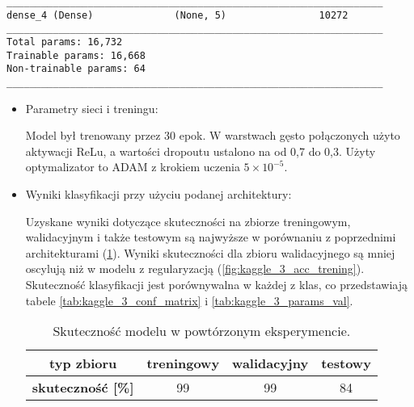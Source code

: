 {\newsavebox\myvff
\begin{lrbox}{\myvff}
\setlength{\myminipagewidth}{0.9\linewidth} %
\setlength{\myminipagecentering}{(\linewidth-\myminipagewidth)/2}
\noindent\hspace{\myminipagecentering}\begin{minipage}{\myminipagewidth}
\begin{verbatim}
_________________________________________________________________
dense_4 (Dense)              (None, 5)                10272     
_________________________________________________________________
Total params: 16,732
Trainable params: 16,668
Non-trainable params: 64
_________________________________________________________________
\end{verbatim} 
\end{minipage}\end{lrbox}
\resizebox{0.75\textwidth}{!}{\usebox\myvff}

\begin{itemize}
\item Parametry sieci i treningu:

Model był trenowany przez 30 epok. W warstwach gęsto połączonych użyto aktywacji ReLu, a wartości dropoutu ustalono na od 0,7 do 0,3. Użyty optymalizator to ADAM z krokiem uczenia \(5 \times 10^{-5}\). 

\item Wyniki klasyfikacji przy użyciu podanej architektury:

Uzyskane wyniki dotyczące skuteczności na zbiorze treningowym, walidacyjnym i także testowym są najwyższe w porównaniu z poprzednimi architekturami (\ref{tab:kaggle_3_acc_2}). Wyniki skuteczności dla zbioru walidacyjnego są mniej oscylują niż w modelu z regularyzacją (\ref{fig:kaggle_3_acc_trening}). Skuteczność klasyfikacji jest porównywalna w każdej z klas, co przedstawiają tabele \ref{tab:kaggle_3_conf_matrix} i \ref{tab:kaggle_3_params_val}.

\begin{table}[h!]
\centering
\caption[Short Heading]{Skuteczność modelu w powtórzonym eksperymencie.}
\label{tab:kaggle_3_acc_2}
\begin{tabular}{|c|c|c|c|}
\hline
\textbf{typ zbioru}           & \textbf{treningowy} & \textbf{walidacyjny} & \textbf{testowy} \\ \hline
\textbf{skuteczność {[}\%{]}} & 99                  & 99           & 84 \\ \hline
\end{tabular}
\end{table}


\end{itemize}}
